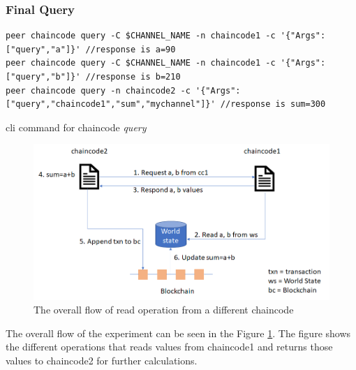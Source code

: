 \documentclass[
  a4paper,  %
  twoside,  %
  bibliography=totoc,
  headsepline,
  cleardoublepage=empty,
  parskip=half,
  draft=false
]{scrbook}
\begin{document}
\subsubsection{Final Query}
\begin{Listing}[h!]
\begin{lstlisting}
peer chaincode query -C $CHANNEL_NAME -n chaincode1 -c '{"Args":["query","a"]}' //response is a=90
peer chaincode query -C $CHANNEL_NAME -n chaincode1 -c '{"Args":["query","b"]}' //response is b=210
peer chaincode query -n chaincode2 -c '{"Args":["query","chaincode1","sum","mychannel"]}' //response is sum=300
\end{lstlisting}
\caption{cli command for chaincode \textit{query}}
\label{lst:cf}
\end{Listing}
\begin{figure}[h!]
\begin{center}
\includegraphics[width=\textwidth]{graphics/readsc.png}
\caption{The overall flow of read operation from a different chaincode}
\label{fig:readsc}
\end{center}
\end{figure}
The overall flow of the experiment can be seen in the Figure \ref{fig:readsc}. The figure shows the different operations that reads values from chaincode1 and returns those values to chaincode2 for further calculations.
\end{document}
